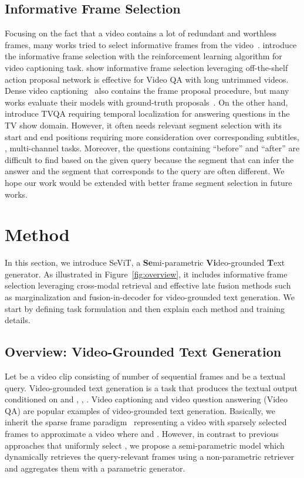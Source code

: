 \documentclass{article}
\newcommand{\frameworkname}{SeViT}
\begin{document}
\subsection{Informative Frame Selection}

Focusing on the fact that a video contains a lot of redundant and worthless frames, many works tried to select informative frames from the video~\cite{chen2018less, yu2019activitynet}. \citet{chen2018less} introduce the informative frame selection with the reinforcement learning algorithm for video captioning task. \citet{yu2019activitynet} show informative frame selection leveraging off-the-shelf action proposal network is effective for Video QA with long untrimmed videos. Dense video captioning~\cite{krishna2017dense, zhou2018towards} also contains the frame proposal procedure, but many works evaluate their models with ground-truth proposals~\cite{seo2022end}. On the other hand, \citet{lei2018tvqa} introduce TVQA requiring temporal localization for answering questions in the TV show domain. However, it often needs relevant segment selection with its start and end positions requiring more consideration over corresponding subtitles, \ie, multi-channel tasks. Moreover, the questions containing ``before'' and ``after'' are difficult to find based on the given query because the segment that can infer the answer and the segment that corresponds to the query are often different. We hope our work would be extended with better frame segment selection in future works.

%
 \section{Method}

In this section, we introduce \frameworkname{}, a \textbf{Se}mi-parametric \textbf{Vi}deo-grounded \textbf{T}ext generator. As illustrated in Figure~\ref{fig:overview}, it includes informative frame selection leveraging cross-modal retrieval and effective late fusion methods such as marginalization and fusion-in-decoder for video-grounded text generation.
We start by defining task formulation and then explain each method and training details.

\subsection{Overview: Video-Grounded Text Generation}

Let  be a video clip consisting of  number of sequential frames and  be a textual query. Video-grounded text generation is a task that produces the textual output  conditioned on  and , \ie, . Video captioning and video question answering (Video QA) are popular examples of video-grounded text generation. Basically, we inherit the sparse frame paradigm~\cite{lei2021less} representing a video with sparsely selected frames  to approximate a video  where  and . However, in contrast to previous approaches that uniformly select , we propose a semi-parametric model which dynamically retrieves the  query-relevant frames using a non-parametric retriever and aggregates them with a parametric generator.
\end{document}
